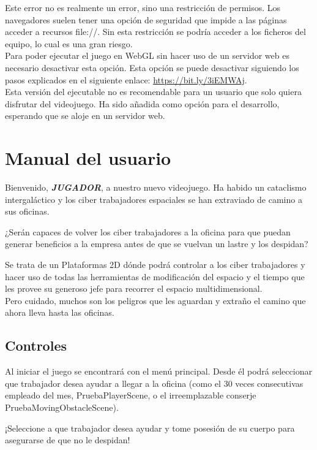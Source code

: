Este error no es realmente un error, sino una restricción de permisos. Los navegadores suelen tener una opción de seguridad que impide a las páginas acceder a recursos file://. Sin esta restricción se podría acceder a los ficheros del equipo, lo cual es una gran riesgo.\\
Para poder ejecutar el juego en WebGL sin hacer uso de un servidor web es necesario desactivar esta opción. Esta opción se puede desactivar siguiendo los pasos explicados en el siguiente enlace: \url{https://bit.ly/3iEMWAj}.\\
Esta versión del ejecutable no es recomendable para un usuario que solo quiera disfrutar del videojuego. Ha sido añadida como opción para el desarrollo, esperando que se aloje en un servidor web.

\section{Manual del usuario}
Bienvenido, \textit{\textbf{JUGADOR}}, a nuestro nuevo videojuego. Ha habido un \textcolor{endeavour}{cataclismo intergaláctico} y los \textcolor{azulWorker}{ciber trabajadores espaciales} se han extraviado de camino a sus oficinas.


¿Serán capaces de volver los \textcolor{azulWorker}{ciber trabajadores} a la oficina para que puedan generar beneficios a la empresa antes de que se vuelvan un lastre y los despidan?

Se trata de un Plataformas 2D dónde podrá controlar a los \textcolor{azulWorker}{ciber trabajadores} y hacer uso de todas las herramientas de modificación del espacio y el tiempo que les provee su generoso jefe para recorrer el \textcolor{endeavour}{espacio multidimensional}.\\
Pero cuidado, muchos son los peligros que les aguardan y extraño el camino que ahora lleva hasta las oficinas.

\subsection{Controles}
Al iniciar el juego se encontrará con el menú principal. Desde él podrá seleccionar que \textcolor{azulWorker}{trabajador} desea ayudar a llegar a la oficina (como el 30 veces consecutivas empleado del mes, PruebaPlayerScene, o el irreemplazable conserje PruebaMovingObstacleScene).

¡Seleccione a que \textcolor{azulWorker}{trabajador} desea ayudar y tome posesión de su cuerpo para asegurarse de que no le despidan!

